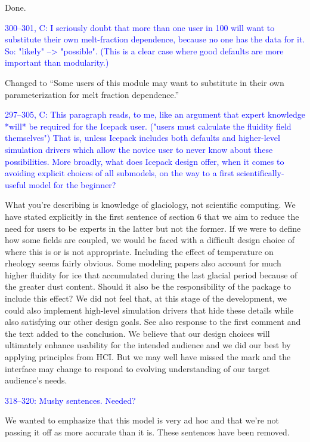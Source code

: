 \documentclass{article}
\theoremstyle{definition}
\theoremstyle{plain}
\begin{document}
Done.

\textcolor{blue}{300--301, C:  I seriously doubt that more than one user in 100 will want to substitute their own melt-fraction dependence, because no one has the data for it.  So: "likely" --> "possible".  (This is a clear case where good defaults are more important than modularity.)}

Changed to ``Some users of this module may want to substitute in their own parameterization for melt fraction dependence.''

\textcolor{blue}{297--305, C:  This paragraph reads, to me, like an argument that expert knowledge *will* be required for the Icepack user.  ("users must calculate the fluidity field themselves")  That is, unless Icepack includes both defaults and higher-level simulation drivers which allow the novice user to never know about these possibilities.  More broadly, what does Icepack design offer, when it comes to avoiding explicit choices of all submodels, on the way to a first scientifically-useful model for the beginner?}

What you're describing is knowledge of glaciology, not scientific computing.
We have stated explicitly in the first sentence of section 6 that we aim to reduce the need for users to be experts in the latter but not the former.
If we were to define how some fields are coupled, we would be faced with a difficult design choice of where this is or is not appropriate.
Including the effect of temperature on rheology seems fairly obvious.
Some modeling papers also account for much higher fluidity for ice that accumulated during the last glacial period because of the greater dust content.
Should it also be the responsibility of the package to include this effect?
We did not feel that, at this stage of the development, we could also implement high-level simulation drivers that hide these details while also satisfying our other design goals.
See also response to the first comment and the text added to the conclusion.
We believe that our design choices will ultimately enhance usability for the intended audience and we did our best by applying principles from HCI.
But we may well have missed the mark and the interface may change to respond to evolving understanding of our target audience's needs.

\textcolor{blue}{318--320:  Mushy sentences.  Needed?}

We wanted to emphasize that this model is very ad hoc and that we're not passing it off as more accurate than it is.
These sentences have been removed.
\end{document}
